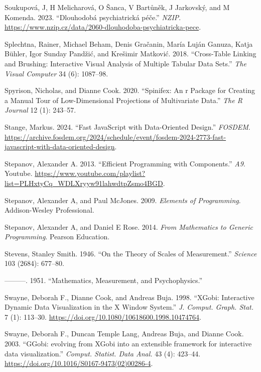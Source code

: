 \documentclass[
]{book}
\newlength{\cslhangindent}
\newenvironment{CSLReferences}[2] %
 {\begin{list}{}{%
  \setlength{\itemindent}{0pt}
  \setlength{\leftmargin}{0pt}
  \setlength{\parsep}{0pt}
  \ifodd #1
   \setlength{\leftmargin}{\cslhangindent}
   \setlength{\itemindent}{-1\cslhangindent}
  \fi
  \setlength{\itemsep}{#2\baselineskip}}}
 {\end{list}}
\theoremstyle{definition}
\theoremstyle{definition}
\theoremstyle{definition}
\theoremstyle{definition}
\theoremstyle{remark}
\begin{document}
\begin{CSLReferences}{1}{0}
Soukupová, J, H Melicharová, O Šanca, V Bartůněk, J Jarkovský, and M Komenda. 2023. {``{Dlouhodobá psychiatrická péče}.''} \emph{NZIP}. \url{https://www.nzip.cz/data/2060-dlouhodoba-psychiatricka-pece}.

Splechtna, Rainer, Michael Beham, Denis Gračanin, María Luján Ganuza, Katja Bühler, Igor Sunday Pandžić, and Krešimir Matković. 2018. {``Cross-Table Linking and Brushing: Interactive Visual Analysis of Multiple Tabular Data Sets.''} \emph{The Visual Computer} 34 (6): 1087--98.

Spyrison, Nicholas, and Dianne Cook. 2020. {``Spinifex: An r Package for Creating a Manual Tour of Low-Dimensional Projections of Multivariate Data.''} \emph{The R Journal} 12 (1): 243--57.

Stange, Markus. 2024. {``Fast JavaScript with Data-Oriented Design.''} \emph{FOSDEM}. \url{https://archive.fosdem.org/2024/schedule/event/fosdem-2024-2773-fast-javascript-with-data-oriented-design}.

Stepanov, Alexander A. 2013. {``Efficient Programming with Components.''} \emph{A9}. Youtube. \url{https://www.youtube.com/playlist?list=PLHxtyCq_WDLXryyw91lahwdtpZsmo4BGD}.

Stepanov, Alexander A, and Paul McJones. 2009. \emph{Elements of Programming}. Addison-Wesley Professional.

Stepanov, Alexander A, and Daniel E Rose. 2014. \emph{From Mathematics to Generic Programming}. Pearson Education.

Stevens, Stanley Smith. 1946. {``On the Theory of Scales of Measurement.''} \emph{Science} 103 (2684): 677--80.

---------. 1951. {``Mathematics, Measurement, and Psychophysics.''}

Swayne, Deborah F., Dianne Cook, and Andreas Buja. 1998. {``{XGobi: Interactive Dynamic Data Visualization in the X Window System}.''} \emph{J. Comput. Graph. Stat.} 7 (1): 113--30. \url{https://doi.org/10.1080/10618600.1998.10474764}.

Swayne, Deborah F., Duncan Temple Lang, Andreas Buja, and Dianne Cook. 2003. {``{GGobi: evolving from XGobi into an extensible framework for interactive data visualization}.''} \emph{Comput. Statist. Data Anal.} 43 (4): 423--44. \url{https://doi.org/10.1016/S0167-9473(02)00286-4}.


\end{CSLReferences}
\end{document}
